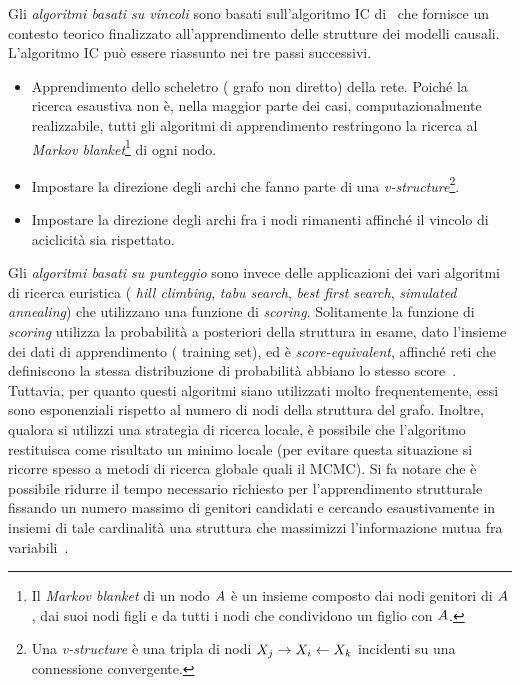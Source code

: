 Gli \emph{algoritmi basati su vincoli} sono basati sull'algoritmo \acf{IC} di~\citet{Verma1991} che fornisce un contesto teorico finalizzato all'apprendimento delle strutture dei modelli causali. L'algoritmo \acs{IC} può essere riassunto nei tre passi successivi.
\begin{itemize}
    \item Apprendimento dello scheletro (\ie{} grafo non diretto) della rete. Poiché la ricerca esaustiva non è, nella maggior parte dei casi, computazionalmente realizzabile, tutti gli algoritmi di apprendimento restringono la ricerca al \emph{Markov blanket}\footnote{\label{note:markov-blanket}Il \emph{Markov blanket} di un nodo $\mathnormal{A}$ è un insieme composto dai nodi genitori di $\mathnormal{A}$, dai suoi nodi figli e da tutti i nodi che condividono un figlio con $\mathnormal{A}$.} di ogni nodo.
    \item Impostare la direzione degli archi che fanno parte di una \emph{v-structure}\footnote{Una \emph{v-structure} è una tripla di nodi $\mathnormal{X}_j\rightarrow\mathnormal{X}_i\leftarrow\mathnormal{X}_k$ incidenti su una connessione convergente.}.
    \item Impostare la direzione degli archi fra i nodi rimanenti affinché il vincolo di aciclicità sia rispettato.
\end{itemize}

Gli \emph{algoritmi basati su punteggio} sono invece delle applicazioni dei vari algoritmi di ricerca euristica (\eg{} \emph{hill climbing}, \emph{tabu search}, \emph{best first search}, \emph{simulated annealing}) che utilizzano una funzione di \emph{scoring}. Solitamente la funzione di \emph{scoring} utilizza la probabilità a posteriori della struttura in esame, dato l'insieme dei dati di apprendimento (\ie{} training set), ed è \emph{score-equivalent}, affinché reti che definiscono la stessa distribuzione di probabilità abbiano lo stesso score~\citep{Chickering2013}. Tuttavia, per quanto questi algoritmi siano utilizzati molto frequentemente, essi sono esponenziali rispetto al numero di nodi della struttura del grafo. Inoltre, qualora si utilizzi una strategia di ricerca locale, è possibile che l'algoritmo restituisca come risultato un minimo locale (per evitare questa situazione si ricorre spesso a metodi di ricerca globale quali il \acs{MCMC}). Si fa notare che è possibile ridurre il tempo necessario richiesto per l'apprendimento strutturale fissando un numero massimo di genitori candidati e cercando esaustivamente in insiemi di tale cardinalità una struttura che massimizzi l'informazione mutua fra variabili~\citep[][]{Heckerman1995}.

